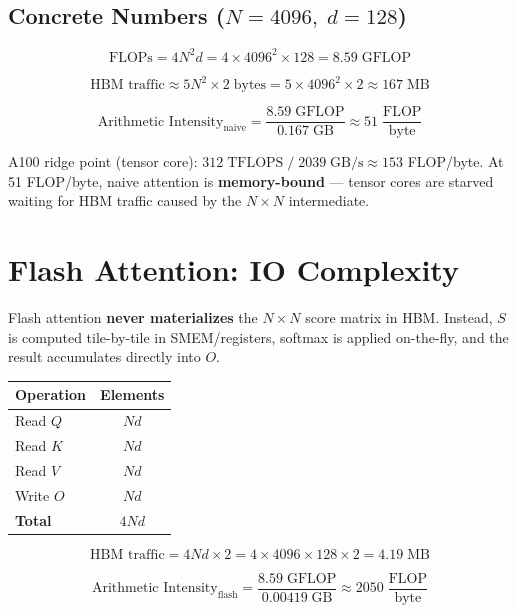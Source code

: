 \documentclass[11pt, letterpaper]{article}
\begin{document}
\subsection{Concrete Numbers ($N = 4096, \; d = 128$)}

\[
\text{FLOPs} = 4N^2 d = 4 \times 4096^2 \times 128 = 8.59 \;\text{GFLOP}
\]

\[
\text{HBM traffic} \approx 5N^2 \times 2 \;\text{bytes} = 5 \times 4096^2 \times 2 \approx 167 \;\text{MB}
\]

\begin{equation}
\text{Arithmetic Intensity}_{\text{naive}} = \frac{8.59 \;\text{GFLOP}}{0.167 \;\text{GB}} \approx 51 \;\frac{\text{FLOP}}{\text{byte}}
\end{equation}

A100 ridge point (tensor core): $312\;\text{TFLOPS}\;/\;2039\;\text{GB/s} \approx 153$ FLOP/byte. At 51 FLOP/byte, naive attention is \textbf{memory-bound} --- tensor cores are starved waiting for HBM traffic caused by the $N \times N$ intermediate.

\section{Flash Attention: IO Complexity}

Flash attention \textbf{never materializes} the $N \times N$ score matrix in HBM. Instead, $S$ is computed tile-by-tile in SMEM/registers, softmax is applied on-the-fly, and the result accumulates directly into $O$.

\begin{table}[h]
\centering
\begin{tabular}{@{}lc@{}}
\toprule
\textbf{Operation} & \textbf{Elements} \\
\midrule
Read $Q$  & $Nd$ \\
Read $K$  & $Nd$ \\
Read $V$  & $Nd$ \\
Write $O$ & $Nd$ \\
\midrule
\textbf{Total} & $4Nd$ \\
\bottomrule
\end{tabular}
\end{table}

\[
\text{HBM traffic} = 4Nd \times 2 = 4 \times 4096 \times 128 \times 2 = 4.19 \;\text{MB}
\]

\begin{equation}
\boxed{
\text{Arithmetic Intensity}_{\text{flash}} = \frac{8.59 \;\text{GFLOP}}{0.00419 \;\text{GB}} \approx 2050 \;\frac{\text{FLOP}}{\text{byte}}
}
\end{equation}
\end{document}
